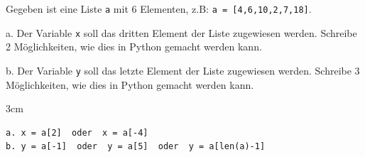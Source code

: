 \question[4]
Gegeben ist eine Liste \texttt{a} mit 6 Elementen, z.B: \texttt{a = [4,6,10,2,7,18]}.

a. Der Variable \texttt{x} soll das dritten Element der Liste zugewiesen werden.
 Schreibe 2 Möglichkeiten, wie dies in Python gemacht werden kann.

b. Der Variable \texttt{y} soll das letzte Element der Liste 
zugewiesen werden. Schreibe 3 Möglichkeiten, wie dies in Python gemacht werden kann. 


\begin{solutionbox}{3cm}
\begin{lstlisting}
a. x = a[2]  oder  x = a[-4]
b. y = a[-1]  oder  y = a[5]  oder  y = a[len(a)-1]

\end{lstlisting}
\end{solutionbox}